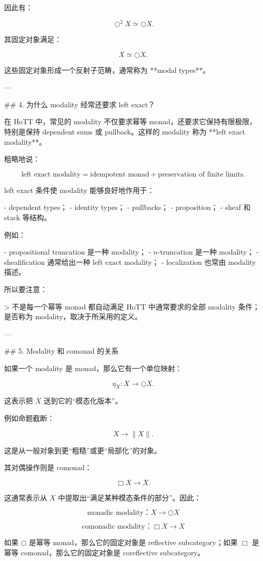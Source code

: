 \documentclass{ctexart}
\begin{document}
\begin{markdown}
因此有：

$$
\bigcirc^2 X\simeq \bigcirc X.
$$

其固定对象满足：

$$
X\simeq \bigcirc X.
$$

这些固定对象形成一个反射子范畴，通常称为 **modal types**。

---

## 4. 为什么 modality 经常还要求 left exact？

在 HoTT 中，常见的 modality 不仅要求幂等 monad，还要求它保持有限极限，特别是保持 dependent sums 或 pullback。这样的 modality 称为 **left exact modality**。

粗略地说：

$$
\text{left exact modality} = \text{idempotent monad} + \text{preservation of finite limits}.
$$

left exact 条件使 modality 能够良好地作用于：

- dependent types；
- identity types；
- pullbacks；
- proposition；
- sheaf 和 stack 等结构。

例如：

- propositional truncation 是一种 modality；
- $n$-truncation 是一种 modality；
- sheafification 通常给出一种 left exact modality；
- localization 也常由 modality 描述。

所以要注意：

> 不是每一个幂等 monad 都自动满足 HoTT 中通常要求的全部 modality 条件；是否称为 modality，取决于所采用的定义。

---

## 5. Modality 和 comonad 的关系

如果一个 modality 是 monad，那么它有一个单位映射：

$$
\eta_X:X\to \bigcirc X.
$$

这表示把 $X$ 送到它的“模态化版本”。

例如命题截断：

$$
X\to \|X\|.
$$

这是从一般对象到更“粗糙”或更“局部化”的对象。

其对偶操作则是 comonad：

$$
\Box X\to X.
$$

这通常表示从 $X$ 中提取出“满足某种模态条件的部分”。因此：

$$
\boxed{
\text{monadic modality：} X\to \bigcirc X
}
$$

$$
\boxed{
\text{comonadic modality：} \Box X\to X
}
$$

如果 $\bigcirc$ 是幂等 monad，那么它的固定对象是 reflective subcategory；如果 $\Box$ 是幂等 comonad，那么它的固定对象是 coreflective subcategory。


\end{markdown}
\end{document}
